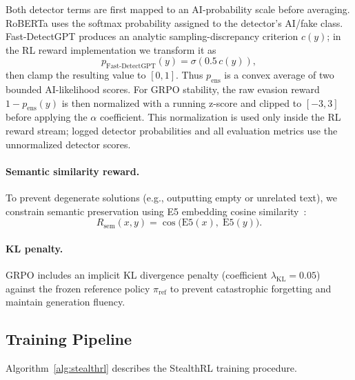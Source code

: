 \documentclass[11pt]{article}
\begin{document}
Both detector terms are first mapped to an AI-probability scale before averaging. RoBERTa uses the softmax probability assigned to the detector's AI/fake class. Fast-DetectGPT produces an analytic sampling-discrepancy criterion $c(y)$; in the RL reward implementation we transform it as
\begin{equation}
  p_{\text{Fast-DetectGPT}}(y) = \sigma(0.5\,c(y)),
\end{equation}
then clamp the resulting value to $[0,1]$. Thus $p_{\text{ens}}$ is a convex average of two bounded AI-likelihood scores. For GRPO stability, the raw evasion reward $1-p_{\text{ens}}(y)$ is then normalized with a running z-score and clipped to $[-3,3]$ before applying the $\alpha$ coefficient. This normalization is used only inside the RL reward stream; logged detector probabilities and all evaluation metrics use the unnormalized detector scores.

\paragraph{Semantic similarity reward.} To prevent degenerate solutions (e.g., outputting empty or unrelated text), we constrain semantic preservation using E5 embedding cosine similarity~\cite{wang2022e5}:
\begin{equation}
  R_{\text{sem}}(x, y) = \cos\bigl(\text{E5}(x),\; \text{E5}(y)\bigr).
\end{equation}

\paragraph{KL penalty.} GRPO includes an implicit KL divergence penalty (coefficient $\lambda_{\text{KL}} = 0.05$) against the frozen reference policy $\pi_{\text{ref}}$ to prevent catastrophic forgetting and maintain generation fluency.

\subsection{Training Pipeline}
\label{sec:training}

Algorithm~\ref{alg:stealthrl} describes the StealthRL training procedure.
\end{document}
